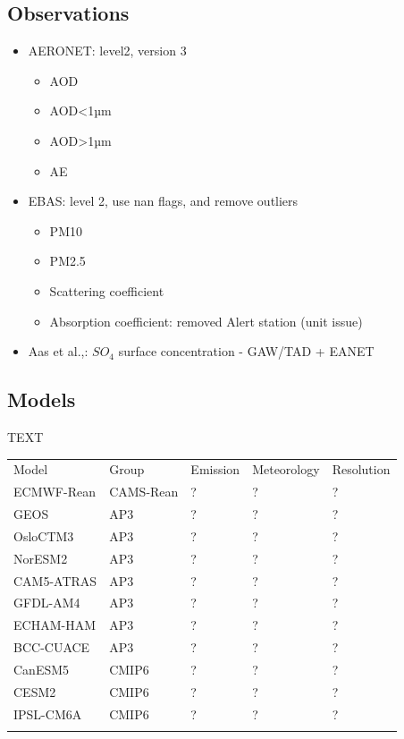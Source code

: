 \documentclass[journal abbreviation, manuscript]{copernicus}
\begin{document}
\subsection{Observations}
\begin{itemize}
 \item  AERONET: level2, version 3
       \begin{itemize}
        \item AOD
        \item AOD<1µm
        \item AOD>1µm
        \item AE
       \end{itemize}
 \item EBAS: level 2, use nan flags, and remove outliers
       \begin{itemize}
        \item PM10
        \item PM2.5
        \item Scattering coefficient
        \item Absorption coefficient: removed Alert station (unit issue)
       \end{itemize}
 \item Aas et al.,: $SO_{4}$ surface concentration - GAW/TAD + EANET
\end{itemize}

\subsection{Models}
TEXT

\begin{tabular}{lllll}
 \tophline
 Model      & Group     & Emission & Meteorology & Resolution \\
 \middlehline
 ECMWF-Rean & CAMS-Rean & ?        & ?           & ?          \\
 GEOS       & AP3       & ?        & ?           & ?          \\
 OsloCTM3   & AP3       & ?        & ?           & ?          \\
 NorESM2    & AP3       & ?        & ?           & ?          \\
 CAM5-ATRAS & AP3       & ?        & ?           & ?          \\
 GFDL-AM4   & AP3       & ?        & ?           & ?          \\
 ECHAM-HAM  & AP3       & ?        & ?           & ?          \\
 BCC-CUACE  & AP3       & ?        & ?           & ?          \\
 CanESM5    & CMIP6     & ?        & ?           & ?          \\
 CESM2      & CMIP6     & ?        & ?           & ?          \\
 IPSL-CM6A  & CMIP6     & ?        & ?           & ?          \\
 \bottomhline
\end{tabular}
\end{document}
